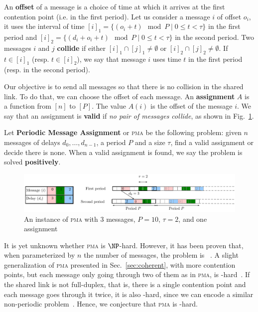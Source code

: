 \documentclass[a4paper,UKenglish,cleveref, autoref, thm-restate]{lipics-v2019}
\newcommand\pma{\textsc{pma}\xspace}
\begin{document}
An \textbf{offset} of a message is a choice of time at which it arrives at the first contention point (i.e. in the first period). Let us consider a message $i$ of offset $o_i$, it uses the interval of time $[i]_1 = \{ (o_i + t) \mod P \mid 0 \leq t < \tau \}$ in the first period and $[i]_2 = \{ (d_i + o_i + t) \mod P \mid 0 \leq t < \tau \}$ in the second period. Two messages $i$ and $j$ \textbf{collide} if either $[i]_1 \cap [j]_1 \neq \emptyset $ or $[i]_2 \cap [j]_2 \neq \emptyset $. If $t \in [i]_1$ (resp. $t \in [i]_2$), we say that message $i$ uses time $t$ in the first period (resp. in the second period).
 
Our objective is to send all messages so that there is no collision in the shared link.
To do that, we can choose the offset of each message. An \textbf{assignment} $A$ is a function from $[n]$ to $[P]$. The value $A(i)$ is the offset of the message $i$. We say that an assignment is \textbf{valid} if \emph{no pair of messages collide}, as shown in Fig.~\ref{fig:assignment}.

Let \textbf{Periodic Message Assignment} or \pma be the following problem: given $n$ messages of delays $d_0,\dots,d_{n-1}$, a period $P$ and a size $\tau$, find a valid assignment or decide there is none. When a valid assignment is found, we say the problem is solved \textbf{positively}.

\begin{figure}
\begin{center}
\includegraphics[scale=0.7]{instance}
\end{center}
\caption{An instance of \pma with $3$ messages, $P= 10$, $\tau = 2$, and one assignment}
\label{fig:assignment}
\end{figure}

It is yet unknown whether \pma is $\NP$-hard. However, it has been proven that, when parameterized by $n$ the number of messages, the problem is \FPT~\cite{barth2018deterministic}. A slight generalization of \pma presented in Sec.~\ref{sec:coherent}, with more contention points, but each message only going through two of them as in \pma, is \NP-hard~\cite{barth2018deterministic}. If the shared link is not full-duplex, that is, there is a single contention point and each message goes through it twice, it is also \NP-hard, since we can encode a similar non-periodic problem~\cite{orman1997complexity}. Hence, we conjecture that \pma is \NP-hard.
	
\end{document}
